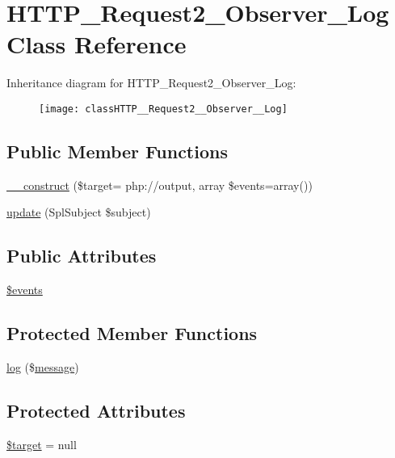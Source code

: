 \hypertarget{classHTTP__Request2__Observer__Log}{}\section{H\+T\+T\+P\+\_\+\+Request2\+\_\+\+Observer\+\_\+\+Log Class Reference}
\label{classHTTP__Request2__Observer__Log}
Inheritance diagram for H\+T\+T\+P\+\_\+\+Request2\+\_\+\+Observer\+\_\+\+Log\+:\begin{figure}[H]
\begin{center}
\leavevmode
\texttt{[image: classHTTP\_\_Request2\_\_Observer\_\_Log]}
\end{center}
\end{figure}
\subsection*{Public Member Functions}
\begin{DoxyCompactItemize}
\item 
\hyperlink{classHTTP__Request2__Observer__Log_ac52da3d54a5034de7e5883c792b0131d}{\+\_\+\+\_\+construct} (\$target= \textquotesingle{}php\+://output\textquotesingle{}, array \$events=array())
\item 
\hyperlink{classHTTP__Request2__Observer__Log_a3afb07b1a609c2f3c12b9cd5fa267947}{update} (Spl\+Subject \$subject)
\end{DoxyCompactItemize}
\subsection*{Public Attributes}
\begin{DoxyCompactItemize}
\item 
\hyperlink{classHTTP__Request2__Observer__Log_a28a4c14e527f6e34cbd3f0c1fa482e97}{\$events}
\end{DoxyCompactItemize}
\subsection*{Protected Member Functions}
\begin{DoxyCompactItemize}
\item 
\hyperlink{classHTTP__Request2__Observer__Log_a253f36793403dd77277fb2e76d19c117}{log} (\$\hyperlink{classmessage}{message})
\end{DoxyCompactItemize}
\subsection*{Protected Attributes}
\begin{DoxyCompactItemize}
\item 
\hyperlink{classHTTP__Request2__Observer__Log_aadc9b19bcddc1bba14f73d3e23ce6214}{\$target} = null
\end{DoxyCompactItemize}


